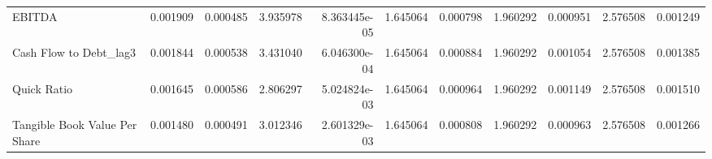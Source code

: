 \documentclass[12pt,a4paper,english]{article}
\begin{document}
{{\begin{tabular}{@{}lrrrrrrrrrr@{}}
			EBITDA                         & 0.001909                 & 0.000485                    & 3.935978                  & 8.363445e-05                             & 1.645064                      & 0.000798                      & 1.960292                     & 0.000951                     & 2.576508                     & 0.001249                     \\
			Cash Flow to Debt\_lag3        & 0.001844                 & 0.000538                    & 3.431040                  & 6.046300e-04                             & 1.645064                      & 0.000884                      & 1.960292                     & 0.001054                     & 2.576508                     & 0.001385                     \\
			Quick Ratio                    & 0.001645                 & 0.000586                    & 2.806297                  & 5.024824e-03                             & 1.645064                      & 0.000964                      & 1.960292                     & 0.001149                     & 2.576508                     & 0.001510                     \\
			Tangible Book Value Per Share  & 0.001480                 & 0.000491                    & 3.012346                  & 2.601329e-03                             & 1.645064                      & 0.000808                      & 1.960292                     & 0.000963                     & 2.576508                     & 0.001266                     \\ \bottomrule
		\end{tabular}%
	}
}
\end{document}
